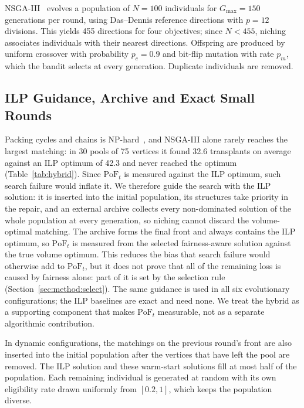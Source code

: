 \documentclass[journal]{IEEEtran}
\newcommand{\pof}{\ensuremath{\mathrm{PoF}_t}}
\begin{document}
NSGA-III~\cite{deb2014nsga3} evolves a population of $N = 100$
individuals for $G_{\max} = 150$ generations per round, using
Das--Dennis reference directions with $p = 12$ divisions.
This yields 455 directions for four objectives; since $N < 455$,
niching associates individuals with their nearest directions.
Offspring are produced by uniform crossover with probability
$p_c = 0.9$ and bit-flip mutation with rate $p_m$, which the bandit
selects at every generation.
Duplicate individuals are removed.

\subsection{ILP Guidance, Archive and Exact Small Rounds}
\label{sec:method:hybrid}

Packing cycles and chains is NP-hard~\cite{abraham2007clearing}, and
NSGA-III alone rarely reaches the largest matching: in 30 pools of 75
vertices it found 32.6 transplants on average against an ILP optimum
of 42.3 and never reached the optimum (Table~\ref{tab:hybrid}). Since
$\pof$ is measured against the ILP optimum, such search failure would
inflate it. We therefore guide the search with the ILP solution: it is
inserted into the initial population, its structures take priority in
the repair, and an external archive collects every non-dominated
solution of the whole population at every generation, so niching
cannot discard the volume-optimal matching. The archive forms the
final front and always contains the ILP optimum, so $\pof$ is measured
from the selected fairness-aware solution against the true volume
optimum. This reduces the bias that search failure would otherwise add
to $\pof$, but it does not prove that all of the remaining loss is
caused by fairness alone: part of it is set by the selection rule
(Section~\ref{sec:method:select}). The same guidance is used in all
six evolutionary configurations; the ILP baselines are exact and need
none. We treat the hybrid as a supporting component that makes $\pof$
measurable, not as a separate algorithmic contribution.

In dynamic configurations, the matchings on the previous round's front
are also inserted into the initial population after the vertices that
have left the pool are removed.
The ILP solution and these warm-start solutions fill at most half of
the population.
Each remaining individual is generated at random with its own
eligibility rate drawn uniformly from $[0.2, 1]$, which keeps the
population diverse.
\end{document}
